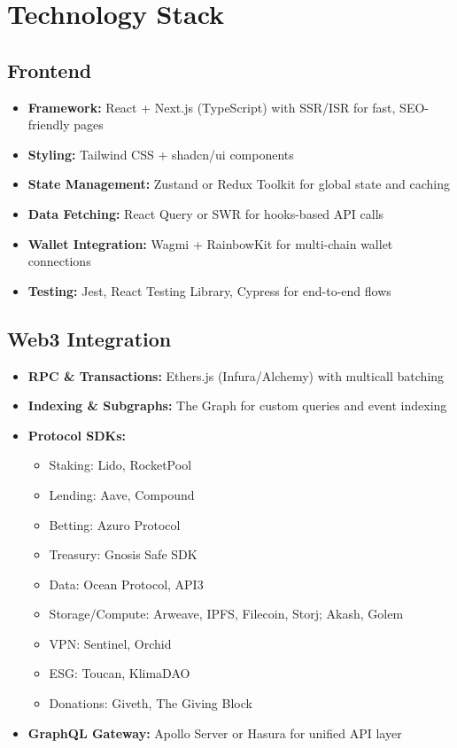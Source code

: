 \documentclass[13pt]{extarticle}
\begin{document}
\newpage
\section{Technology Stack}

\subsection{Frontend}
\begin{itemize}[left=1em]
  \item \textbf{Framework:} React + Next.js (TypeScript) with SSR/ISR for fast, SEO-friendly pages  
  \item \textbf{Styling:} Tailwind CSS + shadcn/ui components  
  \item \textbf{State Management:} Zustand or Redux Toolkit for global state and caching  
  \item \textbf{Data Fetching:} React Query or SWR for hooks-based API calls  
  \item \textbf{Wallet Integration:} Wagmi + RainbowKit for multi-chain wallet connections  
  \item \textbf{Testing:} Jest, React Testing Library, Cypress for end-to-end flows  
\end{itemize}

\subsection{Web3 Integration}
\begin{itemize}[left=1em]
  \item \textbf{RPC \& Transactions:} Ethers.js (Infura/Alchemy) with multicall batching  
  \item \textbf{Indexing \& Subgraphs:} The Graph for custom queries and event indexing  
  \item \textbf{Protocol SDKs:}  
    \begin{itemize}[left=1.2em]
      \item Staking: Lido, RocketPool  
      \item Lending: Aave, Compound  
      \item Betting: Azuro Protocol  
      \item Treasury: Gnosis Safe SDK  
      \item Data: Ocean Protocol, API3  
      \item Storage/Compute: Arweave, IPFS, Filecoin, Storj; Akash, Golem  
      \item VPN: Sentinel, Orchid  
      \item ESG: Toucan, KlimaDAO  
      \item Donations: Giveth, The Giving Block  
    \end{itemize}
  \item \textbf{GraphQL Gateway:} Apollo Server or Hasura for unified API layer  
\end{itemize}
\end{document}
